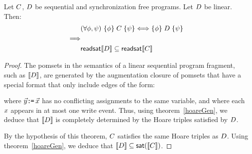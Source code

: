 \begin{theorem}\label{seqcompleteness}
Let $C$, $D$ be sequential and synchronization free programs.  Let $D$ be linear.  Then:
\begin{align*}
& (\forall \phi,\psi) \ \{\phi\}\allowbreak\;C\;\allowbreak\{\psi\} \Longleftrightarrow \{\phi\}\allowbreak\;D\;\allowbreak\{\psi\}  \\
\Longrightarrow & \\
& \mathsf{readsat}{\llbracket D\rrbracket} \subseteq \mathsf{readsat}{\llbracket C\rrbracket} 
\end{align*}
\begin{proof}
The pomsets in the semantics of a linear sequential program fragment, such as $\llbracket D\rrbracket$, are generated by the augmentation closure of pomsets that have a special format that only include edges of the form: \begin{tikzdisplay}[node distance=1em]
\end{tikzdisplay}
where $\vec{y}\texttt{:}\mkern-1mu\texttt{=}\, \vec{x}$ has no conflicting assignments to the same variable, and where each $x$ appears in at most one write event. Thus, using  theorem~\ref{hoareGen}, we deduce that $\llbracket D\rrbracket$ is completely determined by the Hoare triples satisfied by $D$.  

By the hypothesis of this theorem, $C$ satisfies the same Hoare triples as $D$.  Using  theorem~\ref{hoareGen}, we deduce that $\llbracket D\rrbracket \subseteq \mathsf{sat}(\llbracket C\rrbracket)$. 
\end{proof}
\end{theorem}

